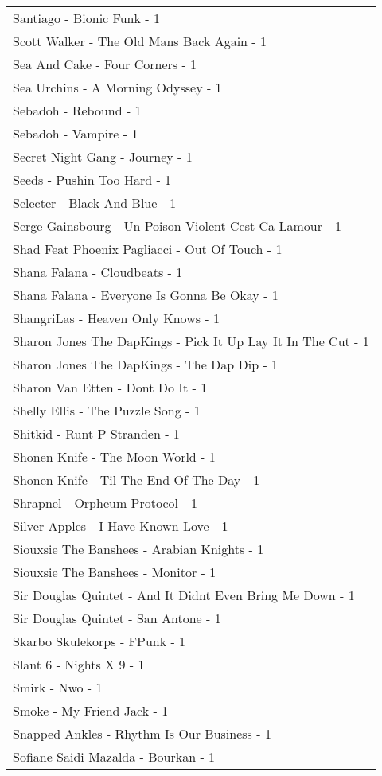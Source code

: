 \documentclass[
]{article}
\begin{document}
\begin{longtable}{l}
Santiago - Bionic Funk - 1 \\ 
Scott Walker - The Old Mans Back Again - 1 \\ 
Sea And Cake - Four Corners - 1 \\ 
Sea Urchins - A Morning Odyssey - 1 \\ 
Sebadoh - Rebound - 1 \\ 
Sebadoh - Vampire - 1 \\ 
Secret Night Gang - Journey - 1 \\ 
Seeds - Pushin Too Hard - 1 \\ 
Selecter - Black And Blue - 1 \\ 
Serge Gainsbourg - Un Poison Violent Cest Ca Lamour - 1 \\ 
Shad Feat Phoenix Pagliacci - Out Of Touch - 1 \\ 
Shana Falana - Cloudbeats - 1 \\ 
Shana Falana - Everyone Is Gonna Be Okay - 1 \\ 
ShangriLas - Heaven Only Knows - 1 \\ 
Sharon Jones The DapKings - Pick It Up Lay It In The Cut - 1 \\ 
Sharon Jones The DapKings - The Dap Dip - 1 \\ 
Sharon Van Etten - Dont Do It - 1 \\ 
Shelly Ellis - The Puzzle Song - 1 \\ 
Shitkid - Runt P Stranden - 1 \\ 
Shonen Knife - The Moon World - 1 \\ 
Shonen Knife - Til The End Of The Day - 1 \\ 
Shrapnel - Orpheum Protocol - 1 \\ 
Silver Apples - I Have Known Love - 1 \\ 
Siouxsie The Banshees - Arabian Knights - 1 \\ 
Siouxsie The Banshees - Monitor - 1 \\ 
Sir Douglas Quintet - And It Didnt Even Bring Me Down - 1 \\ 
Sir Douglas Quintet - San Antone - 1 \\ 
Skarbo Skulekorps - FPunk - 1 \\ 
Slant 6 - Nights X 9 - 1 \\ 
Smirk - Nwo - 1 \\ 
Smoke - My Friend Jack - 1 \\ 
Snapped Ankles - Rhythm Is Our Business - 1 \\ 
Sofiane Saidi Mazalda - Bourkan - 1 \\ 

\end{longtable}
\end{document}
